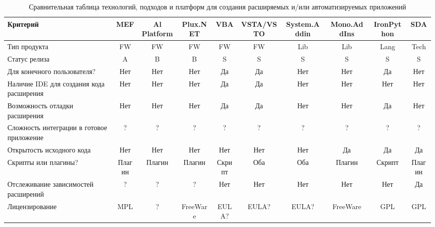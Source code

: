 \begin{landscape}

\begin{table}[H]
  \caption{Сравнительная таблица технологий, подходов и платформ для создания расширяемых и/или автоматизируемых приложений}
  \label{tabular:tech_compare_tab}
  \begin{center}
  \begin{tabular}{|p{4.5cm}|c|c|c|c|c|c|c|c|c|}
  
    \hline
      Критерий &
      MEF &
      Al Platform &
      Plux.NET &
      VBA &
      VSTA/VSTO &
      System.Addin &
      Mono.AddIns &
      IronPython &
      SDA \\
    \hline
      Тип продукта &
      FW &
      FW &
      FW &
      FW &
      FW &
      Lib &
      Lib &
      Lang &
      Tech \\
    \hline
      Статус релиза &
      A &
      B &
      B &
      S &
      S &
      S &
      S &
      S &
      S \\
    \hline
      Для конечного пользователя? &
      Нет &
      Нет &
      Нет &
      Да &
      Да &
      Нет &
      Нет &
      Да &
      Нет \\
    \hline
      Наличие IDE для создания кода расширения &
      Нет &
      Нет &
      Нет &
      Да &
      Да &
      Нет &
      Нет &
      Нет &
      Нет \\
    \hline
      Возможность отладки расширения &
      Нет &
      Нет &
      Нет &
      Да &
      Да &
      Нет &
      Нет &
      Да &
      Нет \\
    \hline
      Сложность интеграции в готовое приложение &
      ? &
      ? &
      ? &
      ? &
      ? &
      ? &
      ? &
      ? &
      ? \\
    \hline
      Открытость исходного кода &
      Нет &
      Нет &
      Нет &
      Нет &
      Нет &
      Нет &
      Да &
      Да &
      Да \\
    \hline
      Скрипты или плагины? &
      Плагин &
      Плагин &
      Плагин &
      Скрипт &
      Оба &
      Оба &
      Плагин &
      Скрипт &
      Плагин \\
    \hline
      Отслеживание зависимостей расширений &
      ? &
      ? &
      ? &
      Нет &
      Нет &
      Нет &
      Нет &
      Нет &
      Да \\
    \hline
      Лицензирование &
      MPL &
      ? &
      FreeWare &
      EULA? &
      EULA? &
      EULA? &
      FreeWare &
      GPL &
      GPL \\
    \hline
    
  \end{tabular}
  \end{center}
\end{table}

\end{landscape}
